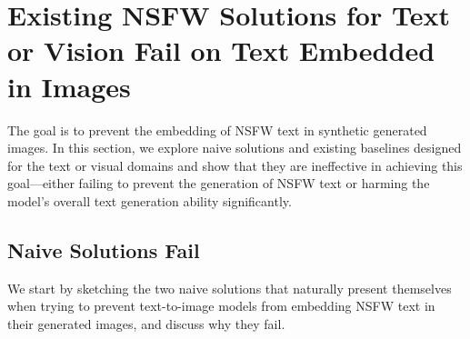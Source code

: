 
\section{Existing NSFW Solutions for Text or Vision Fail on Text Embedded in Images}
\label{sec:existingmitigations} 
The goal is to prevent the embedding of NSFW text in synthetic generated images. 
In this section, we explore naive solutions and existing baselines designed for the text or visual domains and show that they are ineffective in achieving this goal---either failing to prevent the generation of NSFW text or harming the model's overall text generation ability significantly.

\subsection{Naive Solutions Fail}

We start by sketching the two naive solutions that naturally present themselves when trying to prevent text-to-image models from embedding NSFW text in their generated images, and discuss why they fail.

